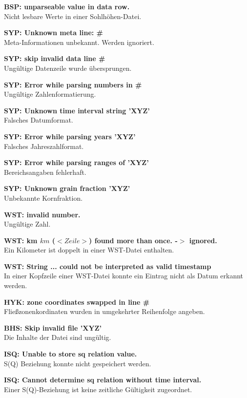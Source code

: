 \textbf{BSP: unparseable value in data row.}
\\Nicht lesbare Werte in einer Sohlhöhen-Datei.

\textbf{SYP: Unknown meta line: \#}
\\Meta-Informationen unbekannt. Werden ignoriert.

\textbf{SYP: skip invalid data line \#}
\\Ungültige Datenzeile wurde übersprungen.

\textbf{SYP: Error while parsing numbers in \#}
\\Ungültige Zahlenformatierung.

\textbf{SYP: Unknown time interval string 'XYZ'}
\\Falsches Datumformat.

\textbf{SYP: Error while parsing years 'XYZ'}
\\Falsches Jahreszahlformat.

\textbf{SYP: Error while parsing ranges of 'XYZ'}
\\Bereichsangaben fehlerhaft.

\textbf{SYP: Unknown grain fraction 'XYZ'}
\\Unbekannte Kornfraktion.

\textbf{WST: invalid number.}
\\Ungültige Zahl.

\textbf{WST: km $km$ ($<Zeile>$) found more than once. -$>$ ignored.}
\\Ein Kilometer ist doppelt in einer WST-Datei enthalten.

\textbf{WST: String ... could not be interpreted as valid timestamp}
\\In einer Kopfzeile einer WST-Datei konnte ein Eintrag nicht als Datum erkannt werden.

\textbf{HYK: zone coordinates swapped in line \#}
\\Fließzonenkordinaten wurden in umgekehrter Reihenfolge angeben.

\textbf{BHS: Skip invalid file 'XYZ'}
\\Die Inhalte der Datei sind ungültig.

\textbf{ISQ: Unable to store sq relation value.}
\\S(Q) Beziehung konnte nicht gespeichert werden.

\textbf{ISQ: Cannot determine sq relation without time interval.}
\\Einer S(Q)-Beziehung ist keine zeitliche Gültigkeit zugeordnet.

